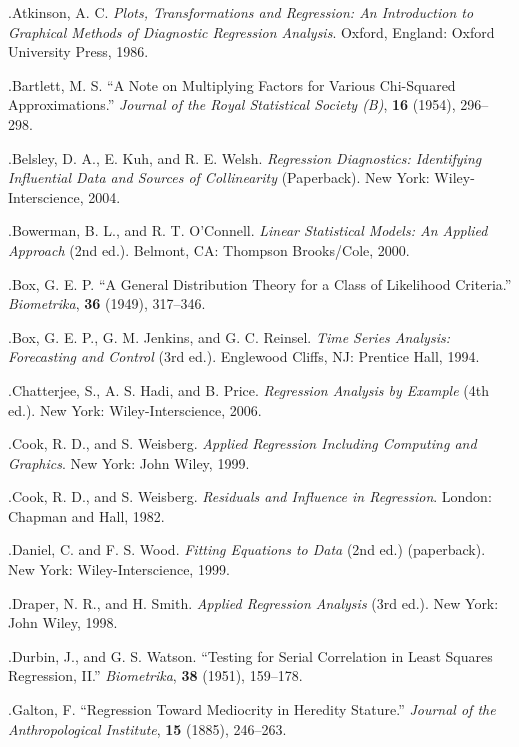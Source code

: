 
.\quad Atkinson, A. C. \textit{Plots, Transformations and Regression: An Introduction to Graphical Methods of Diagnostic Regression Analysis}. Oxford, England: Oxford University Press, 1986.

.\quad Bartlett, M. S. “A Note on Multiplying Factors for Various Chi-Squared Approximations.” \textit{Journal of the Royal Statistical Society (B)}, \textbf{16} (1954), 296–298.

.\quad Belsley, D. A., E. Kuh, and R. E. Welsh. \textit{Regression Diagnostics: Identifying Influential Data and Sources of Collinearity} (Paperback). New York: Wiley-Interscience, 2004.

.\quad Bowerman, B. L., and R. T. O'Connell. \textit{Linear Statistical Models: An Applied Approach} (2nd ed.). Belmont, CA: Thompson Brooks/Cole, 2000.

.\quad Box, G. E. P. “A General Distribution Theory for a Class of Likelihood Criteria.” \textit{Biometrika}, \textbf{36} (1949), 317–346.

.\quad Box, G. E. P., G. M. Jenkins, and G. C. Reinsel. \textit{Time Series Analysis: Forecasting and Control} (3rd ed.). Englewood Cliffs, NJ: Prentice Hall, 1994.

.\quad Chatterjee, S., A. S. Hadi, and B. Price. \textit{Regression Analysis by Example} (4th ed.). New York: Wiley-Interscience, 2006.

.\quad Cook, R. D., and S. Weisberg. \textit{Applied Regression Including Computing and Graphics}. New York: John Wiley, 1999.

.\quad Cook, R. D., and S. Weisberg. \textit{Residuals and Influence in Regression}. London: Chapman and Hall, 1982.

.\quad Daniel, C. and F. S. Wood. \textit{Fitting Equations to Data} (2nd ed.) (paperback). New York: Wiley-Interscience, 1999.

.\quad Draper, N. R., and H. Smith. \textit{Applied Regression Analysis} (3rd ed.). New York: John Wiley, 1998.

.\quad Durbin, J., and G. S. Watson. “Testing for Serial Correlation in Least Squares Regression, II.” \textit{Biometrika}, \textbf{38} (1951), 159–178.

.\quad Galton, F. “Regression Toward Mediocrity in Heredity Stature.” \textit{Journal of the Anthropological Institute}, \textbf{15} (1885), 246–263.

